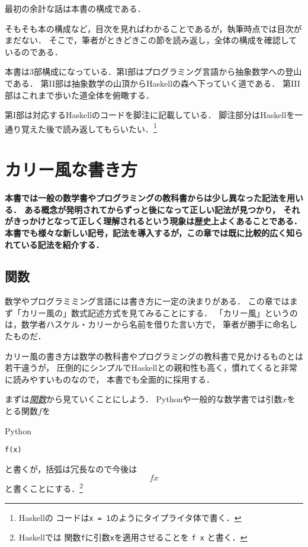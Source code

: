 \documentclass[a5paper,draft]{jsbook}
\newcommand{\programminglanguage}[1]{\textsf{#1}}
\newcommand{\haskell}{\programminglanguage{Haskell}}
\newcommand{\python}{\programminglanguage{Python}}
\newenvironment{leader}{\begingroup\bf}{\endgroup}
\newcommand{\keyword}[1]{{\underline{\emph{#1}}}}
\newcommand{\code}[1]{\texttt{#1}}
\newenvironment{pythoncode}{\begin{itembox}[r]{\python}}{\end{itembox}}
\newcommand{\pthnId}[1]{{DO NOT USE}--\textit{#1}}
\begin{document}
最初の余計な話は本書の構成である．

そもそも本の構成など，目次を見ればわかることであるが，執筆時点では目次がまだない．
そこで，筆者がときどきこの節を読み返し，全体の構成を確認しているのである．

本書は3部構成になっている．第I部はプログラミング言語から抽象数学への登山である．
第II部は抽象数学の山頂から\haskell の森へ下っていく道である．
第III部はこれまで歩いた道全体を俯瞰する．

第I部は対応する\haskell のコードを脚注に記載している．
脚注部分は\haskell を一通り覚えた後で読み返してもらいたい．\footnote{\haskell の
コードは\code{x = 1}のようにタイプライタ体で書く．}


\chapter{カリー風な書き方}

\begin{leader}
本書では一般の数学書やプログラミングの教科書からは少し異なった記法を用いる．
ある概念が発明されてからずっと後になって正しい記法が見つかり，
それがきっかけとなって正しく理解されるという現象は歴史上よくあることである．
本書でも様々な新しい記号，記法を導入するが，この章では既に比較的広く知られている記法を紹介する．
\end{leader}

\section{関数}

数学やプログラミミング言語には書き方に一定の決まりがある．
この章ではまず「カリー風の」数式記述方式を見てみることにする．
「カリー風」というのは，数学者ハスケル・カリーから名前を借りた言い方で，
筆者が勝手に命名したものだ．

カリー風の書き方は数学の教科書やプログラミングの教科書で見かけるものとは若干違うが，
圧倒的にシンプルで\haskell との親和性も高く，慣れてくると非常に読みやすいものなので，
本書でも全面的に採用する．

まずは\keyword{関数}から見ていくことにしよう．
\python や一般的な数学書では引数$x$をとる関数$f$を
\begin{pythoncode}
\begin{verbatim}
f(x)
\end{verbatim}
\end{pythoncode}
と書くが，括弧は冗長なので今後は
\begin{equation}
fx
\end{equation}
と書くことにする．\footnote{\haskell では
関数\code{f}に引数\code{x}を適用させることを \code{f x} と書く．}
\end{document}

